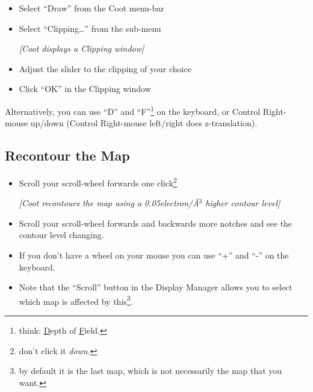 \documentclass{article}
\begin{document}
\begin{itemize}
\item Select \textsf{``Draw''} from the Coot menu-bar
\item Select \textsf{``Clipping\ldots''} from the sub-menu

\textsl{ [Coot displays a Clipping window]}

\item Adjust the slider to the clipping of your choice
\item Click \textsf{``OK''} in the Clipping window
\end{itemize}

Alternatively, you can use ``D'' and ``F''\footnote{think:
  \underline{D}epth of \underline{F}ield.} on the keyboard, or Control
Right-mouse up/down (Control Right-mouse left/right does
z-translation).

\subsection{Recontour the Map}
\begin{itemize}
\item Scroll your scroll-wheel forwards one click\footnote{don't click
    it \emph{down}.}

 \textsl{ [Coot recontours the map using a 0.05electron/\AA$^3$ higher
  contour level]}

\item Scroll your scroll-wheel forwards and backwards more notches and
  see the contour level changing.
  
\item If you don't have a wheel on your mouse you can use ``+'' and
  ``-'' on the keyboard.
  
\item Note that the \textsf{``Scroll''} button in the Display Manager
  allows you to select which map is affected by this\footnote{by
    default it is the last map, which is not necessarily the map that
    you want.}.

\end{itemize}

\end{document}
